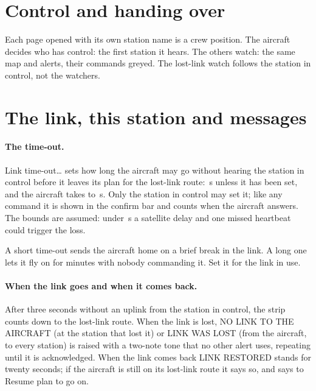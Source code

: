 \documentclass[11pt,a4paper,oneside]{book}
\newcommand{\Tab}[1]{}
\newcommand{\ann}[1]{\textsf{#1}}
\begin{document}
\section{Control and handing over}\label{sec:handover}
Each page opened with its own station name is a crew position. The aircraft decides who has control: the first
station it hears. The others watch: the same map and alerts, their commands greyed. The lost-link watch follows the
station in control, not the watchers.
\begin{center}\small\Tab{ctl_control}\end{center}

\section{The link, this station and messages}\label{sec:link}
\paragraph{The time-out.} \ann{Link time-out\ldots} sets how long the aircraft may go without hearing the station in
control before it leaves its plan for the lost-link route: \MLinkTimeout\,s unless it has been set, and the aircraft
takes \MLinkTimeoutMin{} to \MLinkTimeoutMax\,s. Only the station in control may set it; like any command it is
shown in the confirm bar and counts when the aircraft answers. The bounds are assumed: under \MLinkTimeoutMin\,s a
satellite delay and one missed heartbeat could trigger the loss.
\begin{caution}
A short time-out sends the aircraft home on a brief break in the link. A long one lets it fly on for minutes with
nobody commanding it. Set it for the link in use.
\end{caution}
\paragraph{When the link goes and when it comes back.} After three seconds without an uplink from the station in
control, the strip counts down to the lost-link route. When the link is lost, \ann{NO LINK TO THE AIRCRAFT} (at the
station that lost it) or \ann{LINK WAS LOST} (from the aircraft, to every station) is raised with a two-note tone that no
other alert uses, repeating until it is acknowledged. When the link comes back \ann{LINK RESTORED} stands for twenty
seconds; if the aircraft is still on its lost-link route it says so, and says to \ann{Resume plan} to go on.
\end{document}
